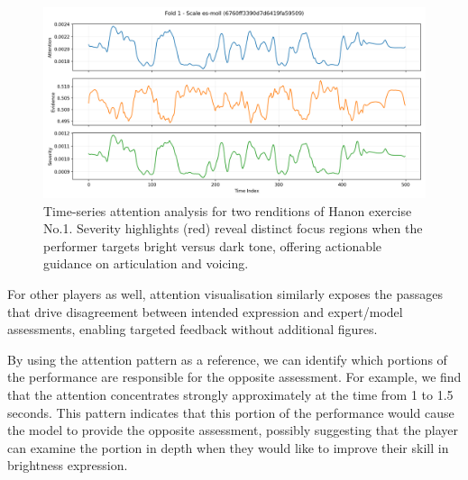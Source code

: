 \documentclass[sigconf,review,anonymous]{acmart}
\begin{document}
{\begin{figure}[t]
  \centering
  \includegraphics[width=\linewidth]{figures/highlight_audio_0_hanon.png}
  \caption{Time-series attention analysis for two renditions of Hanon exercise No.1. Severity highlights (red) reveal distinct focus regions when the performer targets bright versus dark tone, offering actionable guidance on articulation and voicing.}
  \label{highlight_audio_0_hanon}
\end{figure}

For other players as well, attention visualisation similarly exposes the passages that drive disagreement between intended expression and expert/model assessments, enabling targeted feedback without additional figures.

By using the attention pattern as a reference, we can identify which portions of the performance are responsible for the opposite assessment. 
For example, we find that the attention concentrates strongly approximately at the time from 1 to 1.5 seconds.
This pattern indicates that this portion of the performance would cause the model to provide the opposite assessment, possibly suggesting that the player can examine the portion in depth when they would like to improve their skill in brightness expression.

}
\end{document}
